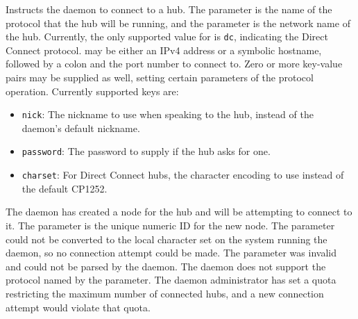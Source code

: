 
\begin{reqdesc}
  Instructs the daemon to connect to a hub. The  parameter
  is the name of the protocol that the hub will be running, and the
   parameter is the network name of the
  hub. Currently, the only supported value for  is
  \texttt{dc}, indicating the Direct Connect
  protocol.  may be either an IPv4 address or a
  symbolic hostname, followed by a colon and the port number to
  connect to. Zero or more key-value pairs may be supplied as well,
  setting certain parameters of the protocol operation. Currently
  supported keys are:
  
  \begin{itemize}
  \item \texttt{nick}: The nickname to use when speaking to the hub,
    instead of the daemon's default nickname.
  \item \texttt{password}: The password to supply if the hub asks for
    one.
  \item \texttt{charset}: For Direct Connect hubs, the character
    encoding to use instead of the default CP1252.
  \end{itemize}
\end{reqdesc}


\begin{responses}
  The daemon has created a node for the hub and will be attempting to
  connect to it. The  parameter is the unique numeric ID for
  the new node.
  The  parameter could not be converted to the local
  character set on the system running the daemon, so no connection
  attempt could be made.
  The  parameter was invalid and could not be parsed
  by the daemon.
  The daemon does not support the protocol named by the 
  parameter.
  The daemon administrator has set a quota restricting the maximum
  number of connected hubs, and a new connection attempt would violate
  that quota.
\end{responses}
